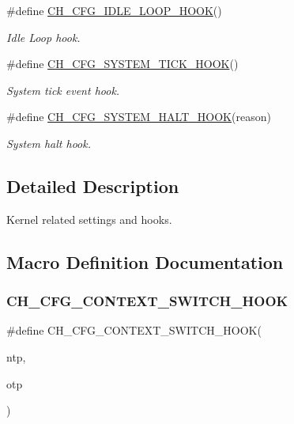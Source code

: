 \begin{DoxyCompactItemize}
\#define \hyperlink{group__config_gad22892d2984f5289c63f963622e7f2af}{C\+H\+\_\+\+C\+F\+G\+\_\+\+I\+D\+L\+E\+\_\+\+L\+O\+O\+P\+\_\+\+H\+O\+OK}()
\begin{DoxyCompactList}\small\item\em Idle Loop hook. \end{DoxyCompactList}\item 
\#define \hyperlink{group__config_ga033f2f0ca73bee1d11095d27e5e6b007}{C\+H\+\_\+\+C\+F\+G\+\_\+\+S\+Y\+S\+T\+E\+M\+\_\+\+T\+I\+C\+K\+\_\+\+H\+O\+OK}()
\begin{DoxyCompactList}\small\item\em System tick event hook. \end{DoxyCompactList}\item 
\#define \hyperlink{group__config_ga03c17b48d4f0444046d41102acb3a54b}{C\+H\+\_\+\+C\+F\+G\+\_\+\+S\+Y\+S\+T\+E\+M\+\_\+\+H\+A\+L\+T\+\_\+\+H\+O\+OK}(reason)
\begin{DoxyCompactList}\small\item\em System halt hook. \end{DoxyCompactList}\end{DoxyCompactItemize}


\subsection{Detailed Description}
Kernel related settings and hooks. 

\subsection{Macro Definition Documentation}
\hypertarget{group__config_ga61b9805943d69980f6778106ad3fbb9c}{}\label{group__config_ga61b9805943d69980f6778106ad3fbb9c} 
\subsubsection{\texorpdfstring{C\+H\+\_\+\+C\+F\+G\+\_\+\+C\+O\+N\+T\+E\+X\+T\+\_\+\+S\+W\+I\+T\+C\+H\+\_\+\+H\+O\+OK}{CH\_CFG\_CONTEXT\_SWITCH\_HOOK}}
{\footnotesize\ttfamily \#define C\+H\+\_\+\+C\+F\+G\+\_\+\+C\+O\+N\+T\+E\+X\+T\+\_\+\+S\+W\+I\+T\+C\+H\+\_\+\+H\+O\+OK(\begin{DoxyParamCaption}\item[{}]{ntp,  }\item[{}]{otp }\end{DoxyParamCaption})}

